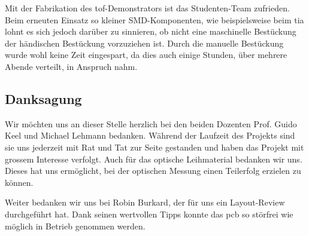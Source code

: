 Mit der Fabrikation des \acrshort{tof}-Demonstrators ist das Studenten-Team zufrieden. Beim erneuten Einsatz so kleiner
SMD-Komponenten, wie beispielsweise beim \acrshort{tia} lohnt es sich jedoch darüber zu sinnieren, ob nicht eine
maschinelle Bestückung der händischen Bestückung vorzuziehen ist. Durch die manuelle Bestückung wurde wohl keine Zeit
eingespart, da dies auch einige Stunden, über mehrere Abende verteilt, in Anspruch nahm.

\subsection{Danksagung}

Wir möchten uns an dieser Stelle herzlich bei den beiden Dozenten Prof. Guido Keel und Michael Lehmann bedanken. Während
der Laufzeit des Projekts sind sie uns jederzeit mit Rat und Tat zur Seite gestanden und haben das Projekt mit grossem
Interesse verfolgt. Auch für das optische Leihmaterial bedanken wir uns. Dieses hat uns ermöglicht, bei der optischen
Messung einen Teilerfolg erzielen zu können.

Weiter bedanken wir uns bei Robin Burkard, der für uns ein Layout-Review durchgeführt hat. Dank seinen wertvollen Tipps
konnte das \acrshort{pcb} so störfrei wie möglich in Betrieb genommen werden.
